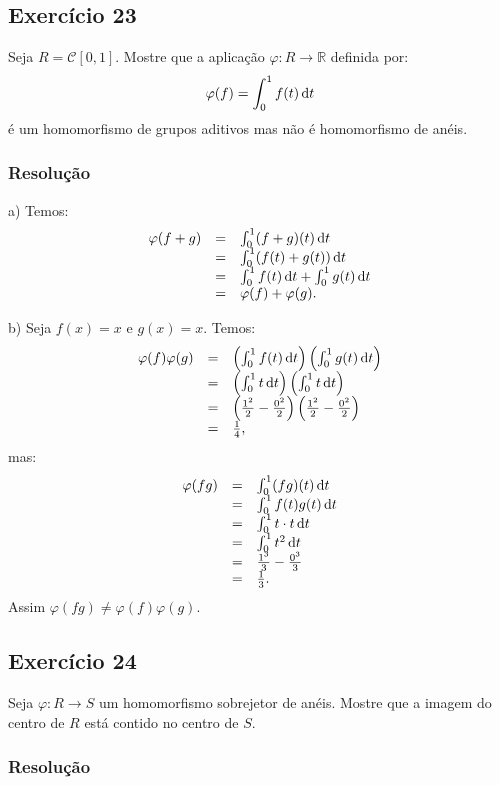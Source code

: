 \documentclass[10pt,a4paper]{article}
\begin{document}
\subsection*{Exercício 23}
Seja $R=\mathcal{C}[0,1]$. Mostre que a aplicação $\varphi:R\rightarrow\mathbb{R}$ definida por:
\[
\varphi(f)=\int_0^1f(t)\dif t
\]
é um homomorfismo de grupos aditivos mas não é homomorfismo de anéis.

\subsubsection*{Resolução}

a) Temos:
\[
\begin{array}{rcl}
\varphi(f+g)&=&\int_0^1(f+g)(t)\dif t\\&=&\int_0^1(f(t)+g(t))\dif t\\&=&\int_0^1f(t)\dif t+\int_0^1g(t)\dif t\\&=&\varphi(f)+\varphi(g).
\end{array}
\]

\noindent
b) Seja $f(x)=x$ e $g(x)=x$. Temos:
\[
\begin{array}{rcl}
\varphi(f)\varphi(g)&=&\left(\int_0^1f(t)\dif t\right)\left(\int_0^1g(t)\dif t\right)\\&=&\left(\int_0^1t\dif t\right)\left(\int_0^1t\dif t\right)\\&=&\left(\frac{1^2}{2}-\frac{0^2}{2}\right)\left(\frac{1^2}{2}-\frac{0^2}{2}\right)\\&=&\frac{1}{4},
\end{array}
\]
mas:
\[
\begin{array}{rcl}
\varphi(fg)&=&\int_0^1(fg)(t)\dif t\\&=&\int_0^1f(t)g(t)\dif t\\&=&\int_0^1t\cdot t\dif t\\&=&\int_0^1t^2\dif t\\&=&\frac{1^3}{3}-\frac{0^3}{3}\\&=&\frac{1}{3}.
\end{array}
\]
Assim $\varphi(fg)\neq\varphi(f)\varphi(g)$.

\subsection*{Exercício 24}
Seja $\varphi:R\rightarrow S$ um homomorfismo sobrejetor de anéis. Mostre que a imagem do centro de $R$ está contido no centro de $S$.

\subsubsection*{Resolução}
\end{document}
